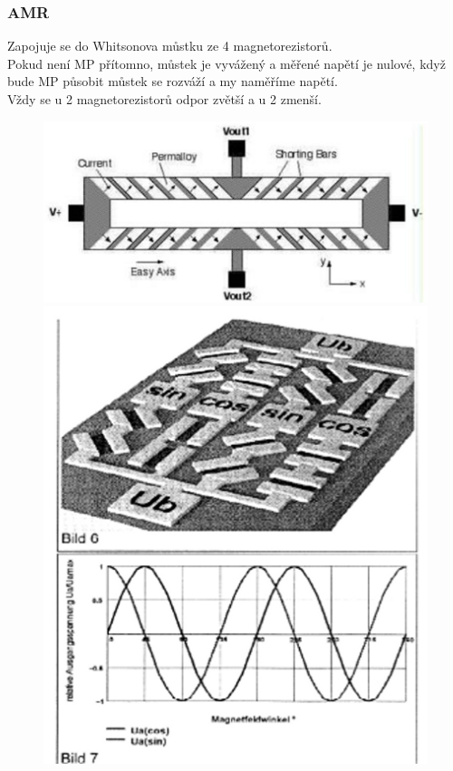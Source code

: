 \subsubsection*{AMR}
Zapojuje se do Whitsonova můstku ze 4 magnetorezistorů.\\
Pokud není MP přítomno, můstek je vyvážený a měřené napětí je nulové, když bude MP působit můstek se rozváží a my naměříme napětí.\\
Vždy se u 2 magnetorezistorů odpor zvětší a u 2 zmenší.\\

\begin{figure}[h!]
    \centering
    \begin{minipage}[b]{0.4\textwidth}
        \centering
        \includegraphics[width = \textwidth]{img/AMR1.png}
    \end{minipage}
    \hfill
    \begin{minipage}[b]{0.4\textwidth}
        \includegraphics[width = \textwidth]{img/AMR2}
    \end{minipage}
\end{figure}

